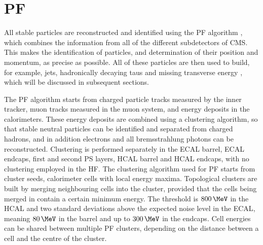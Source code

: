 \section{\acl{PF}}
\label{sec:objects_pf}
All stable particles are reconstructed and identified using the \ac{PF} algorithm \cite{cms-pf-2009,cms-pf-2010-commfirst,cms-pf-2010-2}, which
combines the information from all of the different subdetectors of \ac{CMS}. This makes
the identification of particles, and determination of their position and momentum, as precise
as possible. All of these particles are then used to build, for example, jets, hadronically decaying taus and missing transverse
energy \MET, which will be discussed in subsequent sections.

The \ac{PF} algorithm starts from charged particle tracks measured
by the inner tracker, muon tracks measured in the muon system, and 
energy deposits in the calorimeters. These energy deposits are combined
using a clustering algorithm, so that stable neutral particles can be identified and
separated from charged hadrons, and in addition electrons and all bremsstrahlung photons
can be reconstructed. Clustering is performed separately in the \ac{ECAL} barrel,
\ac{ECAL} endcaps, first and second \ac{PS} layers, \ac{HCAL} barrel and \ac{HCAL} endcaps, with no 
clustering employed in the \ac{HF}.
The clustering algorithm used for \ac{PF} starts from cluster seeds,
calorimeter cells with local energy maxima. Topological clusters are built by 
merging neighbouring cells into the cluster, provided that the cells
being merged in contain a certain minimum energy.
The threshold is $800\,\MeV$ in the \ac{HCAL} and two standard deviations above the
expected noise level in the \ac{ECAL}, meaning $80\,\MeV$ in the barrel and up 
to $300\,\MeV$ in the endcaps. Cell energies can be shared between multiple
\ac{PF} clusters, depending on the distance between a cell and the centre of the cluster.

